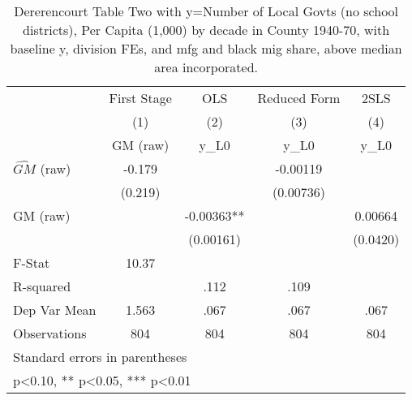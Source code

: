 \begin{table}[htbp]\centering
\def\sym#1{\ifmmode^{#1}\else\(^{#1}\)\fi}
\caption{Dererencourt Table Two with y=Number of Local Govts (no school districts), Per Capita (1,000) by decade in County 1940-70, with baseline y, division FEs, and mfg and black mig share, above median area incorporated.}
\begin{tabular}{l*{4}{c}}
\toprule
                    & First Stage   &         OLS   &Reduced Form   &        2SLS   \\
                    &\multicolumn{1}{c}{(1)}&\multicolumn{1}{c}{(2)}&\multicolumn{1}{c}{(3)}&\multicolumn{1}{c}{(4)}\\
                    &\multicolumn{1}{c}{GM  (raw)}&\multicolumn{1}{c}{y\_L0}&\multicolumn{1}{c}{y\_L0}&\multicolumn{1}{c}{y\_L0}\\
\midrule
$\hat{GM}$ (raw)    &      -0.179   &               &    -0.00119   &               \\
                    &     (0.219)   &               &   (0.00736)   &               \\
\addlinespace
GM  (raw)           &               &    -0.00363** &               &     0.00664   \\
                    &               &   (0.00161)   &               &    (0.0420)   \\
\midrule
F-Stat              &       10.37   &               &               &               \\
R-squared           &               &        .112   &        .109   &               \\
Dep Var Mean        &       1.563   &        .067   &        .067   &        .067   \\
Observations        &         804   &         804   &         804   &         804   \\
\bottomrule
\multicolumn{5}{l}{\footnotesize Standard errors in parentheses}\\
\multicolumn{5}{l}{\footnotesize * p<0.10, ** p<0.05, *** p<0.01}\\
\end{tabular}
\end{table}
